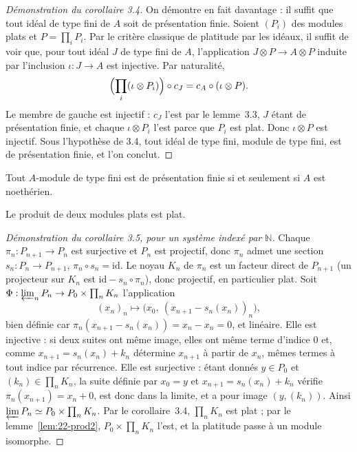 \begin{proof}[Démonstration du corollaire 3.4]
On démontre en fait davantage : il suffit que tout idéal de type fini de $A$ soit de présentation finie. Soient $(P_i)$ des modules plats et $P = \prod_i P_i$. Par le critère classique de platitude par les idéaux, il suffit de voir que, pour tout idéal $J$ de type fini de $A$, l'application $J \otimes P \to A \otimes P$ induite par l'inclusion $\iota : J \to A$ est injective. Par naturalité,
\[
  \Bigl(\prod_i (\iota \otimes P_i)\Bigr) \circ c_J = c_A \circ (\iota \otimes P).
\]
Le membre de gauche est injectif : $c_J$ l'est par le lemme~3.3, $J$ étant de présentation finie, et chaque $\iota \otimes P_i$ l'est parce que $P_i$ est plat. Donc $\iota \otimes P$ est injectif. Sous l'hypothèse de 3.4, tout idéal de type fini, module de type fini, est de présentation finie, et l'on conclut.
\end{proof}

\begin{lemme}\label{lem:22-hyp}
Tout $A$-module de type fini est de présentation finie si et seulement si $A$ est noethérien.
\end{lemme}


\begin{lemme}\label{lem:22-prod2}
Le produit de deux modules plats est plat.
\end{lemme}


\begin{proof}[Démonstration du corollaire 3.5, pour un système indexé par $\mathbb N$]
Chaque $\pi_n : P_{n+1} \to P_n$ est surjective et $P_n$ est projectif, donc $\pi_n$ admet une section $s_n : P_n \to P_{n+1}$, $\pi_n \circ s_n = \mathrm{id}$. Le noyau $K_n$ de $\pi_n$ est un facteur direct de $P_{n+1}$ (un projecteur sur $K_n$ est $\mathrm{id} - s_n \circ \pi_n$), donc projectif, en particulier plat. Soit $\Phi : \varprojlim_n P_n \to P_0 \times \prod_n K_n$ l'application
\[
  (x_n)_n \longmapsto \bigl(x_0,\ (x_{n+1} - s_n(x_n))_n\bigr),
\]
bien définie car $\pi_n(x_{n+1} - s_n(x_n)) = x_n - x_n = 0$, et linéaire. Elle est injective : si deux suites ont même image, elles ont même terme d'indice $0$ et, comme $x_{n+1} = s_n(x_n) + k_n$ détermine $x_{n+1}$ à partir de $x_n$, mêmes termes à tout indice par récurrence. Elle est surjective : étant donnés $y \in P_0$ et $(k_n) \in \prod_n K_n$, la suite définie par $x_0 = y$ et $x_{n+1} = s_n(x_n) + k_n$ vérifie $\pi_n(x_{n+1}) = x_n + 0$, est donc dans la limite, et a pour image $(y, (k_n))$. Ainsi $\varprojlim P_n \simeq P_0 \times \prod_n K_n$. Par le corollaire~3.4, $\prod_n K_n$ est plat ; par le lemme~\ref{lem:22-prod2}, $P_0 \times \prod_n K_n$ l'est, et la platitude passe à un module isomorphe.
\end{proof}

